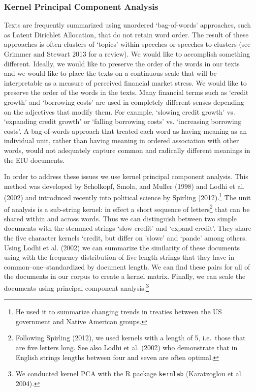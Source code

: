 \documentclass[]{article}
\let\rmarkdownfootnote\footnote%
\def\footnote{\protect\rmarkdownfootnote}
\begin{document}
\subsubsection{Kernel Principal Component
Analysis}\label{kernel-principal-component-analysis}

Texts are frequently summarized using unordered `bag-of-words'
approaches, such as Latent Dirichlet Allocation, that do not retain word
order. The result of these approaches is often clusters of `topics'
within speeches or speeches to clusters (see Grimmer and Stewart 2013
for a review). We would like to accomplish something different. Ideally,
we would like to preserve the order of the words in our texts and we
would like to place the texts on a continuous scale that will be
interpretable as a measure of perceived financial market stress. We
would like to preserve the order of the words in the texts. Many
financial terms such as `credit growth' and `borrowing costs' are used
in completely different senses depending on the adjectives that modify
them. For example, `slowing credit growth' vs. `expanding credit growth'
or `falling borrowing costs' vs. `increasing borrowing costs'. A
bag-of-words approach that treated each word as having meaning as an
individual unit, rather than having meaning in ordered association with
other words, would not adequately capture common and radically different
meanings in the EIU documents.

In order to address these issues we use kernel principal component
analysis. This method was developed by Scholkopf, Smola, and Muller
(1998) and Lodhi et al. (2002) and introduced recently into political
science by Spirling (2012).\footnote{He used it to summarize changing
  trends in treaties between the US government and Native American
  groups.} The unit of analysis is a sub-string kernel: in effect a
short sequence of letters\footnote{Following Spirling (2012), we used
  kernels with a length of 5, i.e.~those that are five letters long. See
  also Lodhi et al. (2002) who demonstrate that in English strings
  lengths between four and seven are often optimal.} that can be shared
within and across words. Thus we can distinguish between two simple
documents with the stemmed strings `slow credit' and `expand credit'.
They share the five character kernels `credit, but differ on 'slowc' and
`pandc' among others. Using Lodhi et al. (2002) we can summarize the
similarity of these documents using with the frequency distribution of
five-length strings that they have in common--one--standardized by
document length. We can find these pairs for all of the documents in our
corpus to create a kernel matrix. Finally, we can scale the documents
using principal component analysis.\footnote{We conducted kernel PCA
  with the R package \texttt{kernlab} (Karatzoglou et al. 2004).}
\end{document}
